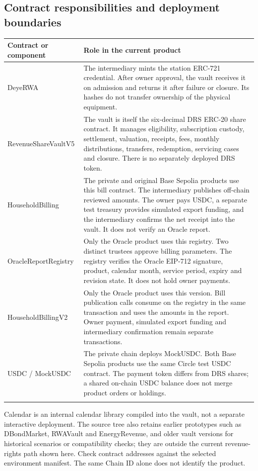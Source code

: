 \documentclass[12pt,a4paper]{article}
\begin{document}
\subsection{Contract responsibilities and deployment boundaries}
\begin{longtable}{L{4cm}L{10.5cm}}\toprule Contract or component & Role in the current product\\\midrule\endhead
DeyeRWA & The intermediary mints the station ERC-721 credential. After owner approval, the vault receives it on admission and returns it after failure or closure. Its hashes do not transfer ownership of the physical equipment.\\\addlinespace
RevenueShareVaultV5 & The vault is itself the six-decimal DRS ERC-20 share contract. It manages eligibility, subscription custody, settlement, valuation, receipts, fees, monthly distributions, transfers, redemption, servicing cases and closure. There is no separately deployed DRS token.\\\addlinespace
HouseholdBilling & The private and original Base Sepolia products use this bill contract. The intermediary publishes off-chain reviewed amounts. The owner pays USDC, a separate test treasury provides simulated export funding, and the intermediary confirms the net receipt into the vault. It does not verify an Oracle report.\\\addlinespace
OracleReportRegistry & Only the Oracle product uses this registry. Two distinct trustees approve billing parameters. The registry verifies the Oracle EIP-712 signature, product, calendar month, service period, expiry and revision state. It does not hold owner payments.\\\addlinespace
HouseholdBillingV2 & Only the Oracle product uses this version. Bill publication calls consume on the registry in the same transaction and uses the amounts in the report. Owner payment, simulated export funding and intermediary confirmation remain separate transactions.\\\addlinespace
USDC / MockUSDC & The private chain deploys MockUSDC. Both Base Sepolia products use the same Circle test USDC contract. The payment token differs from DRS shares; a shared on-chain USDC balance does not merge product orders or holdings.\\\addlinespace
\bottomrule\end{longtable}
Calendar is an internal calendar library compiled into the vault, not a separate interactive deployment. The source tree also retains earlier prototypes such as DBondMarket, RWAVault and EnergyRevenue, and older vault versions for historical scenarios or compatibility checks; they are outside the current revenue-rights path shown here. Check contract addresses against the selected environment manifest. The same Chain ID alone does not identify the product.
\end{document}
